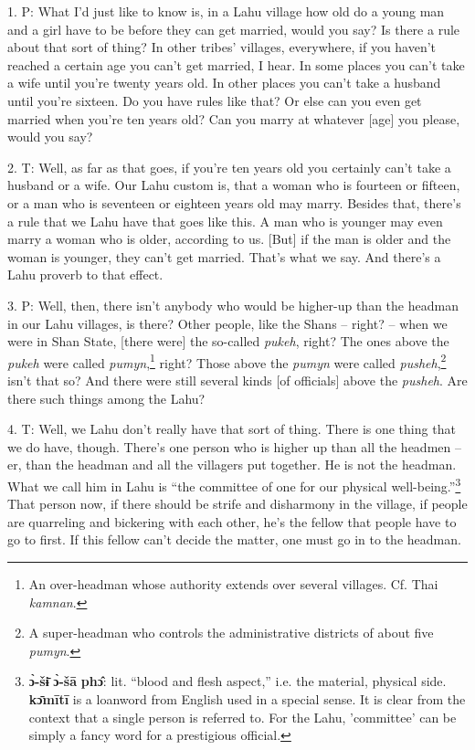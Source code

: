 \setcounter{footnote}{0}

1. P: What I'd just like to know is, in a Lahu village how old do a young man and
a girl have to be before they can get married, would you say? Is there a rule about
that sort of thing? In other tribes' villages, everywhere, if you haven't reached
a certain age you can't get married, I hear. In some places you can't take a wife
until you're twenty years old. In other places you can't take a husband until you're
sixteen. Do you have rules like that? Or else can you even get married when you're
ten years old? Can you marry at whatever [age] you please, would you say?

2. T: Well, as far as that goes, if you're ten years old you certainly can't take
a husband or a wife. Our Lahu custom is, that a woman who is fourteen or fifteen,
or a man who is seventeen or eighteen years old may marry. Besides that, there's
a rule that we Lahu have that goes like this. A man who is younger may even marry
a woman who is older, according to us. [But] if the man is older and the woman
is younger, they can't get married. That's what we say. And there's a Lahu proverb
to that effect.

3. P:  Well, then, there isn't anybody who
would be higher-up than the headman in our Lahu villages, is there? Other people,
like the Shans -- right? -- when we were in Shan State, [there were] the so-called
\textit{pukeh}, right? The ones above the \textit{pukeh} were called \textit{pumyn},\footnote{An over-headman whose authority extends over several villages. Cf. Thai \textit{kamnan}.}
right? Those above the \textit{pumyn} were called \textit{pusheh},\footnote{A super-headman who controls the administrative districts of about five \textit{pumyn}.} isn't that
so? And there were still several kinds [of officials] above the \textit{pusheh}.
Are there such things among the Lahu?

4. T: Well, we Lahu don't really have that sort of thing. There is one thing that
we do have, though. There's one person who is higher up than all the headmen --
er, than the headman and all the villagers put together. He is not the headman.
What we call him in Lahu is ``the committee of one for our physical well-being.''\footnote{\textbf{ɔ̀-šɨ̄} \textbf{ɔ̀-šā} \textbf{phɔ̂}: lit. ``blood and flesh aspect,'' i.e. the material, physical side. \textbf{kɔ̄mītī} is a loanword from English used in a special sense. It is clear from the context that a single person is referred to. For the Lahu, 'committee' can be simply a fancy word for a prestigious official.}
That person now, if there should be strife and disharmony in the village, if people
are quarreling and bickering with each other, he's the fellow that people have
to go to first. If this fellow can't decide the matter, one must go in to the headman.

